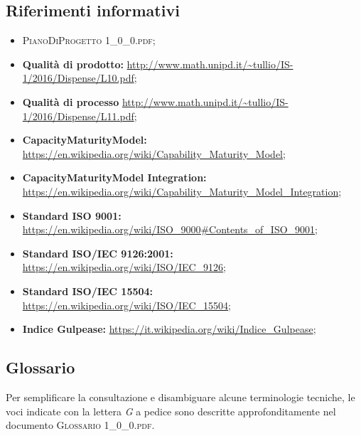 \subsection{Riferimenti informativi}
\begin{itemize}
	\item \textsc{PianoDiProgetto 1\_0\_0.pdf};
	\item \textbf{Qualità di prodotto:} \url{http://www.math.unipd.it/~tullio/IS-1/2016/Dispense/L10.pdf};
	\item \textbf{Qualità di processo} \url{http://www.math.unipd.it/~tullio/IS-1/2016/Dispense/L11.pdf};
	\item \textbf{CapacityMaturityModel:} \url{https://en.wikipedia.org/wiki/Capability_Maturity_Model};
	\item \textbf{CapacityMaturityModel Integration:} \url{https://en.wikipedia.org/wiki/Capability_Maturity_Model_Integration};
	\item \textbf{Standard ISO 9001:} \url{https://en.wikipedia.org/wiki/ISO_9000#Contents_of_ISO_9001};
	\item \textbf{Standard ISO/IEC 9126:2001:} \url{https://en.wikipedia.org/wiki/ISO/IEC_9126};
	\item \textbf{Standard ISO/IEC 15504:} \url{https://en.wikipedia.org/wiki/ISO/IEC_15504};
	\item \textbf{Indice Gulpease:} \url{https://it.wikipedia.org/wiki/Indice_Gulpease};
	
\end{itemize}


\subsection{Glossario}
Per semplificare la consultazione e disambiguare alcune terminologie tecniche, le voci indicate con la lettera \textit{G} a pedice sono descritte approfonditamente nel documento \textsc{Glossario 1\_0\_0.pdf}.